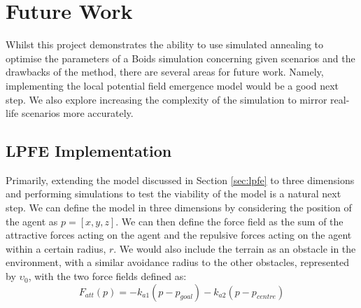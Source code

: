 \documentclass[12pt]{article}
\begin{document}
\newpage
\section{Future Work}
Whilst this project demonstrates the ability to use simulated annealing to optimise the parameters of a Boids simulation concerning given scenarios and the drawbacks of the method, there are several areas for future work. Namely, implementing the local potential field emergence model would be a good next step. We also explore increasing the complexity of the simulation to mirror real-life scenarios more accurately.

\subsection{LPFE Implementation}
Primarily, extending the model discussed in Section \ref{sec:lpfe} to three dimensions and performing simulations to test the viability of the model is a natural next step. We can define the model in three dimensions by considering the position of the agent as $p = [x,y,z]$. We can then define the force field as the sum of the attractive forces acting on the agent and the repulsive forces acting on the agent within a certain radius, $r$. We would also include the terrain as an obstacle in the environment, with a similar avoidance radius to the other obstacles, represented by $\upsilon_0$, with the two force fields defined as:
\begin{equation}
    F_{att}(p) = -k_{a1}(p-p_{goal}) - k_{a2}(p-p_{centre})
\end{equation}
\end{document}
